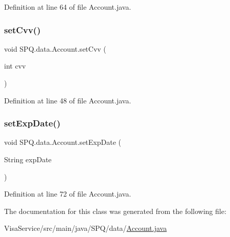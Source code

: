 Definition at line 64 of file Account.\+java.

\mbox{\label{class_s_p_q_1_1data_1_1_account_a572b5452dceb62eea2d1f63b6df90be7}} 
\subsubsection{\texorpdfstring{set\+Cvv()}{setCvv()}}
{\footnotesize\ttfamily void S\+P\+Q.\+data.\+Account.\+set\+Cvv (\begin{DoxyParamCaption}\item[{int}]{cvv }\end{DoxyParamCaption})}



Definition at line 48 of file Account.\+java.

\mbox{\label{class_s_p_q_1_1data_1_1_account_a4c4a9c7f817a565893668bcc634ec143}} 
\subsubsection{\texorpdfstring{set\+Exp\+Date()}{setExpDate()}}
{\footnotesize\ttfamily void S\+P\+Q.\+data.\+Account.\+set\+Exp\+Date (\begin{DoxyParamCaption}\item[{String}]{exp\+Date }\end{DoxyParamCaption})}



Definition at line 72 of file Account.\+java.



The documentation for this class was generated from the following file\+:\begin{DoxyCompactItemize}
\item 
Visa\+Service/src/main/java/\+S\+P\+Q/data/\mbox{\hyperlink{_account_8java}{Account.\+java}}\end{DoxyCompactItemize}
